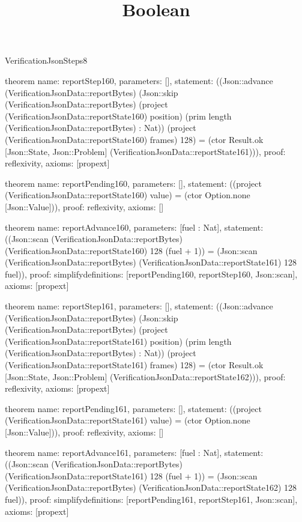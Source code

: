 \begin{lexlean}{VerificationJsonSteps8}
\title{Boolean}
\begin{semanticmodule}

theorem{
  name: reportStep160,
  parameters: [],
  statement: ((Json::advance (VerificationJsonData::reportBytes) (Json::skip (VerificationJsonData::reportBytes) (project (VerificationJsonData::reportState160) position) (prim length (VerificationJsonData::reportBytes) : Nat)) (project (VerificationJsonData::reportState160) frames) 128) = (ctor Result.ok [Json::State, Json::Problem] (VerificationJsonData::reportState161))),
  proof: reflexivity{},
  axioms: [propext]
}

theorem{
  name: reportPending160,
  parameters: [],
  statement: ((project (VerificationJsonData::reportState160) value) = (ctor Option.none [Json::Value])),
  proof: reflexivity{},
  axioms: []
}

theorem{
  name: reportAdvance160,
  parameters: [fuel : Nat],
  statement: ((Json::scan (VerificationJsonData::reportBytes) (VerificationJsonData::reportState160) 128 (fuel + 1)) = (Json::scan (VerificationJsonData::reportBytes) (VerificationJsonData::reportState161) 128 fuel)),
  proof: simplify{definitions: [reportPending160, reportStep160, Json::scan]},
  axioms: [propext]
}

theorem{
  name: reportStep161,
  parameters: [],
  statement: ((Json::advance (VerificationJsonData::reportBytes) (Json::skip (VerificationJsonData::reportBytes) (project (VerificationJsonData::reportState161) position) (prim length (VerificationJsonData::reportBytes) : Nat)) (project (VerificationJsonData::reportState161) frames) 128) = (ctor Result.ok [Json::State, Json::Problem] (VerificationJsonData::reportState162))),
  proof: reflexivity{},
  axioms: [propext]
}

theorem{
  name: reportPending161,
  parameters: [],
  statement: ((project (VerificationJsonData::reportState161) value) = (ctor Option.none [Json::Value])),
  proof: reflexivity{},
  axioms: []
}

theorem{
  name: reportAdvance161,
  parameters: [fuel : Nat],
  statement: ((Json::scan (VerificationJsonData::reportBytes) (VerificationJsonData::reportState161) 128 (fuel + 1)) = (Json::scan (VerificationJsonData::reportBytes) (VerificationJsonData::reportState162) 128 fuel)),
  proof: simplify{definitions: [reportPending161, reportStep161, Json::scan]},
  axioms: [propext]
}


\end{semanticmodule}
\end{lexlean}
